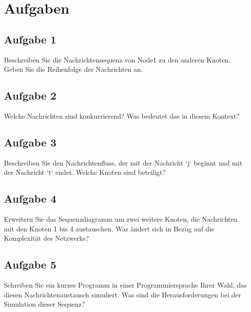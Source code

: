 \documentclass{article}
\begin{document}
\section{Aufgaben}

\subsection{Aufgabe 1}
Beschreiben Sie die Nachrichtensequenz von Node1 zu den anderen Knoten. Geben Sie die Reihenfolge der Nachrichten an.

\subsection{Aufgabe 2}
Welche Nachrichten sind konkurrierend? Was bedeutet das in diesem Kontext?

\subsection{Aufgabe 3}
Beschreiben Sie den Nachrichtenfluss, der mit der Nachricht `j` beginnt und mit der Nachricht `t` endet. Welche Knoten sind beteiligt?

\subsection{Aufgabe 4}
Erweitern Sie das Sequenzdiagramm um zwei weitere Knoten, die Nachrichten mit den Knoten 1 bis 4 austauschen. Was ändert sich in Bezug auf die Komplexität des Netzwerks?

\subsection{Aufgabe 5}
Schreiben Sie ein kurzes Programm in einer Programmiersprache Ihrer Wahl, das diesen Nachrichtenaustausch simuliert. Was sind die Herausforderungen bei der Simulation dieser Sequenz?
\end{document}
